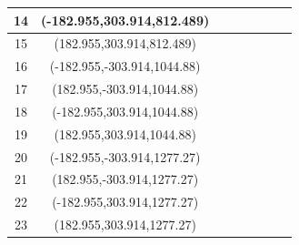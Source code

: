 \documentclass[8pt]{refart}
\begin{document}
{\begin{tabular}{|c|c|c|c|c|c|c|c|}
         \hline
         14 &(-182.955,303.914,812.489)& & & & & &  \\
         \hline
         15 &(182.955,303.914,812.489)& & & & & &  \\
         \hline
         16 &(-182.955,-303.914,1044.88)& & & & & &  \\
         \hline
         17 &(182.955,-303.914,1044.88)& & & & & &  \\
         \hline
         18 &(-182.955,303.914,1044.88)& & & & & &  \\
         \hline
         19 &(182.955,303.914,1044.88)& & & & & &  \\
         \hline
         20 &(-182.955,-303.914,1277.27)& & & & & &  \\
         \hline
         21 &(182.955,-303.914,1277.27)& & & & & &  \\
         \hline
         22 &(-182.955,303.914,1277.27)& & & & & &  \\
         \hline
         23 &(182.955,303.914,1277.27)& & & & & &  \\
        \hline
    \end{tabular}

}

\printindex
\end{document}

